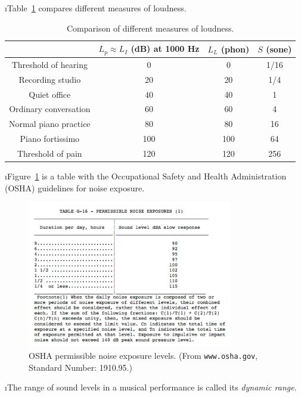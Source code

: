 \i Table~\ref{t:loudnesslevels} compares different 
measures of loudness.
%
\begin{table}[htbp]
\begin{center}
\begin{tabular}{|c|c|c|c|}
\hline
& $L_p\approx L_I$ (dB) at 1000 Hz & $L_L$ (phon) & $S$ (sone) \\
\hline
Threshold of hearing & 0 & 0 & 1/16 \\
Recording studio & 20 & 20 & 1/4 \\
Quiet office & 40 & 40 & 1 \\
Ordinary conversation & 60 & 60 & 4 \\
Normal piano practice & 80 & 80 & 16 \\
Piano fortissimo & 100 & 100 & 64 \\
Threshold of pain & 120 & 120 & 256 \\
\hline
\end{tabular}
\caption{Comparison of different measures of loudness.}
\label{t:loudnesslevels}
\end{center}
\end{table}

\i Figure~\ref{f:OSHA-table} is a table with the
Occupational Safety and Health Administration 
(OSHA) guidelines for noise exposure.
%
\begin{figure}[htbp]
\begin{center}
\includegraphics[width=0.8\textwidth]{OSHA-table}
\caption{OSHA permissible noise exposure levels.
(From {\tt www.osha.gov}, Standard Number: 1910.95.)}
\label{f:OSHA-table}
\end{center}
\end{figure}
%

\i The range of sound levels in a musical 
performance is called its {\em dynamic range}.

